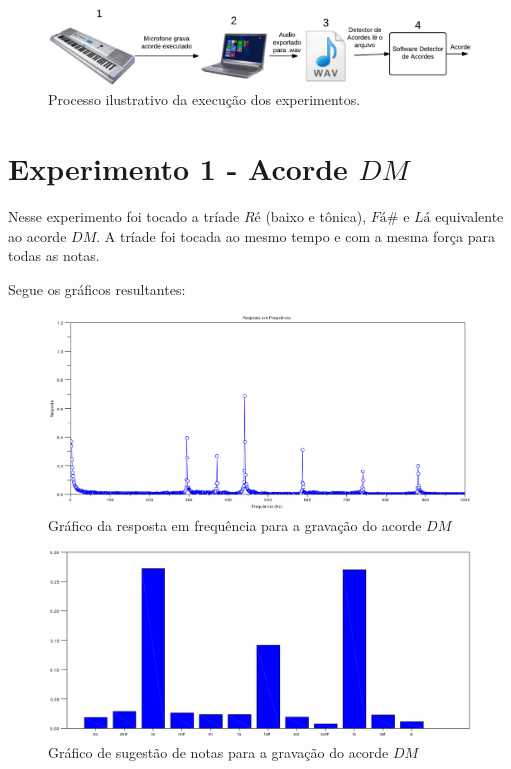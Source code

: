 \begin{figure}[h]
	\centering
		\includegraphics[keepaspectratio=true,scale=0.35]{figuras/processo_experimento.eps}
	\caption{Processo ilustrativo da execução dos experimentos.}
  \label{fig:processo}
\end{figure}


\section{Experimento 1 - Acorde $DM$}
\label{sec:experimento1}

Nesse experimento foi tocado a tríade $Ré$ (baixo e tônica), $Fá\#$ e $Lá$ equivalente ao acorde $DM$. A tríade foi tocada ao mesmo tempo e com a mesma força para todas as notas.

Segue os gráficos resultantes:

\begin{figure}[h]
	\centering
		\includegraphics[keepaspectratio=true,scale=0.49]{figuras/Dm/fft_DM.eps}
	\caption{Gráfico da resposta em frequência para a gravação do acorde $DM$}
\end{figure}

\begin{figure}[h]
	\centering
		\includegraphics[keepaspectratio=true,scale=0.49]{figuras/Dm/notas_DM.eps}
	\caption{Gráfico de sugestão de notas para a gravação do acorde $DM$}
\end{figure}

